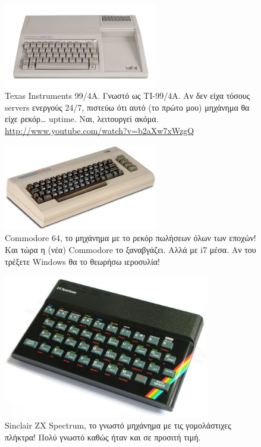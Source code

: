 \begin{figure}
  \centering
  \includegraphics[width=0.60\textwidth]{images/chapter1/ti99}
  \caption[TI-99/4A]{Texas Instruments 99/4A. Γνωστό ως TI-99/4A. Αν δεν είχα τόσους servers ενεργούς 24/7, πιστεύω ότι αυτό (το πρώτο μου) μηχάνημα θα είχε
ρεκόρ\ldots{} uptime. Ναι, λειτουργεί ακόμα.\\
\url{http://www.youtube.com/watch?v=b2aXw7xWzgQ}}
  \label{1-2}
\end{figure}

\begin{figure}
  \centering
  \includegraphics[width=0.60\textwidth]{images/chapter1/commodore64}
  \caption[Commodore 64]{Commodore 64, το μηχάνημα με το ρεκόρ πωλήσεων όλων των εποχών!  Και τώρα η (νέα) Commodore το ξαναβγάζει. Αλλά με i7 μέσα. Αν του τρέξετε Windows θα το θεωρήσω ιεροσυλία!}
  \label{1-3}
\end{figure}

\begin{figure}
  \centering
  \includegraphics[width=0.8\textwidth]{images/chapter1/zxspectrum}
  \caption[Sinclair ZX Spectrum]{Sinclair ZX Spectrum, το γνωστό μηχάνημα με τις γομολάστιχες πλήκτρα! Πολύ γνωστό καθώς ήταν και σε προσιτή τιμή.}
  \label{1-4}
\end{figure}

